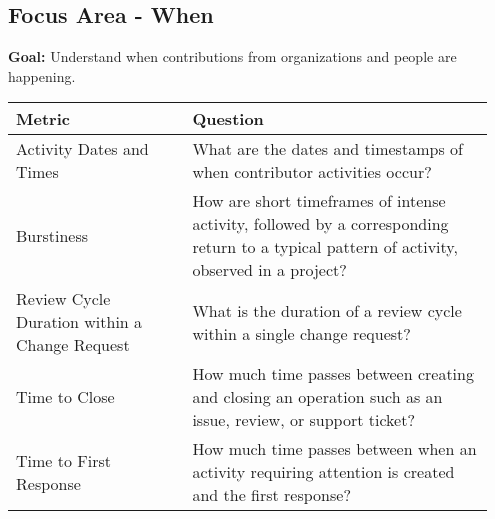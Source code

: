 
\subsection{Focus Area - When}
\textbf{Goal:} Understand when contributions from organizations and people are happening.
\begin{table}[ht]
	\centering
	\begin{tabular}{|p{0.35\linewidth} | p{0.6\linewidth}|}
		\hline
		\hfil \textbf{Metric} & \hfil \textbf{Question} \\ 
		\hline	
		Activity Dates and Times & What are the dates and timestamps of when contributor activities occur? \\
		\hline
		Burstiness & How are short timeframes of intense activity, followed by a corresponding return to a typical pattern of activity, observed in a project? \\ 
		\hline		
		Review Cycle Duration within a Change Request & What is the duration of a review cycle within a single change request? \\ 
		\hline 
		Time to Close & How much time passes between creating and closing an operation such as an issue, review, or support ticket? \\
		\hline
		Time to First Response & How much time passes between when an activity requiring attention is created and the first response? \\
		\hline
	\end{tabular}
\end{table}

